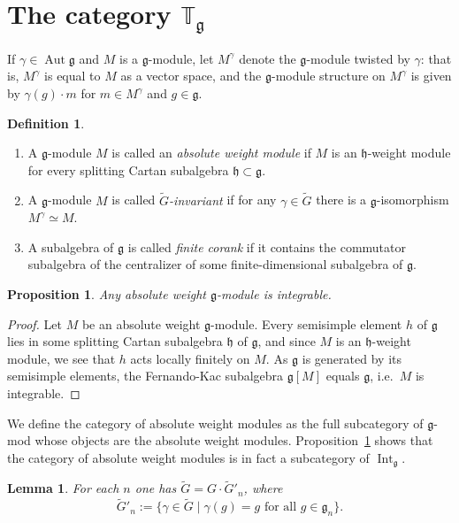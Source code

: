 \documentclass{amsart}
\newcommand{\Tg}{\mathbb T_{\mathfrak g}}
\renewcommand{\gg}{\mathfrak{g}}
\newcommand{\hh}{\mathfrak{h}}
\newcommand{\Aut}{\operatorname{Aut}}
\newtheorem{lemma}[thm]{Lemma}
\newtheorem{prop}[thm]{Proposition}
\theoremstyle{definition}
\newtheorem{defn}[thm]{Definition}
\numberwithin{equation}{section}
\begin{document}
\section{The category $\Tg$} \label{catsec}

If $\gamma \in \Aut \gg$ and $M$ is a $\gg$-module, let $M^\gamma$ denote the $\gg$-module twisted by $\gamma$: that is, $M^\gamma$ is equal to $M$ as a vector space, and the $\gg$-module structure on $M^\gamma$ is given by $\gamma(g)\cdot m$ for $m \in M^\gamma$ and $g \in \gg$.

\begin{defn} 
\begin{enumerate}
\item A $\gg$-module $M$ is called an \emph{absolute weight module} if $M$ is an $\hh$-weight module for every splitting Cartan subalgebra $\hh\subset\gg$.
\item A $\gg$-module $M$ is called \emph{$\tilde{G}$-invariant} if for any $\gamma\in \tilde{G}$ there is a $\gg$-isomorphism $M^\gamma\simeq M$.
\item A subalgebra of $\gg$ is called \emph{finite corank} if it contains the commutator subalgebra of the centralizer of some finite-dimensional subalgebra of $\gg$. 
\end{enumerate}
\end{defn}


\begin{prop} \label{int}
Any absolute weight $\gg$-module is integrable.
\end{prop}

\begin{proof}
Let $M$ be an absolute weight $\gg$-module.  Every semisimple element $h$ of $\gg$ lies in some splitting Cartan subalgebra $\hh$ of $\gg$, and since $M$ is an $\hh$-weight module, we see that $h$ acts locally finitely on $M$.  As $\gg$ is generated by its semisimple elements, the Fernando-Kac subalgebra $\gg [M]$ equals $\gg$, i.e.\ $M$ is integrable.
\end{proof}


We define the category of absolute weight modules as the full subcategory of $\gg$-mod whose objects are the absolute weight modules.  Proposition~\ref{int} shows that the category of absolute weight modules is in fact a subcategory of $\operatorname{Int}_\gg$.


\begin{lemma} \label{tildes}
For each $n$ one has $\tilde{G} = G \cdot \tilde{G}'_n$, where $$\tilde{G}'_n := \{ \gamma \in \tilde{G} \mid \gamma (g) = g \textrm{ for all } g \in \gg_n \}.$$
\end{lemma}
\end{document}
